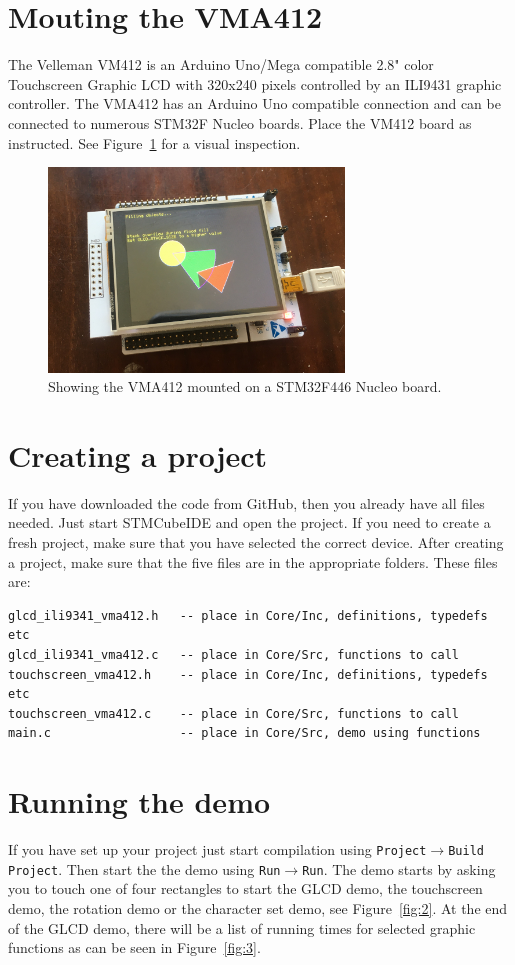 \documentclass[12pt]{article}
\begin{document}
\section{Mouting the VMA412}
The Velleman VM412 is an Arduino Uno/Mega compatible 2.8" color Touchscreen Graphic LCD with 320x240 pixels controlled by an ILI9431 graphic controller.
The VMA412 has an Arduino Uno compatible connection and can be connected to numerous STM32F Nucleo boards.
Place the VM412 board as instructed. See Figure~\ref{fig:1} for a visual inspection.

\begin{figure}[!ht]
\centering
\includegraphics[width=0.7\textwidth]{glcd_demo}
\caption{Showing the VMA412 mounted on a STM32F446 Nucleo board.}
\label{fig:1}
\end{figure}


\section{Creating a project}
If you have downloaded the code from GitHub, then you already have all files needed. Just start STMCubeIDE and open the project. If you need to create a fresh project, make sure that you have selected the correct device. 
After creating a project, make sure that the five files are in the appropriate folders. These files are:

\begin{lstlisting}
glcd_ili9341_vma412.h   -- place in Core/Inc, definitions, typedefs etc
glcd_ili9341_vma412.c   -- place in Core/Src, functions to call
touchscreen_vma412.h    -- place in Core/Inc, definitions, typedefs etc
touchscreen_vma412.c    -- place in Core/Src, functions to call
main.c                  -- place in Core/Src, demo using functions
\end{lstlisting}


\section{Running the demo}
If you have set up your project just start compilation using \texttt{Project}$\rightarrow$\texttt{Build Project}. Then start the the demo using \texttt{Run}$\rightarrow$\texttt{Run}. The demo starts by asking you to touch one of four rectangles to start the GLCD demo, the touchscreen demo, the rotation demo or the character set demo, see Figure~\ref{fig:2}. At the end of the GLCD demo, there will be a list of running times for selected graphic functions as can be seen in Figure~\ref{fig:3}.
\end{document}
